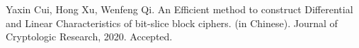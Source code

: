 %
%
%


%
\begin{thebibliography}{8}













Yaxin Cui, Hong Xu, Wenfeng Qi. An Efficient method to construct Differential and Linear Characteristics of bit-slice block ciphers. (in Chinese). Journal of Cryptologic Research, 2020. Accepted. 

\end{thebibliography}
